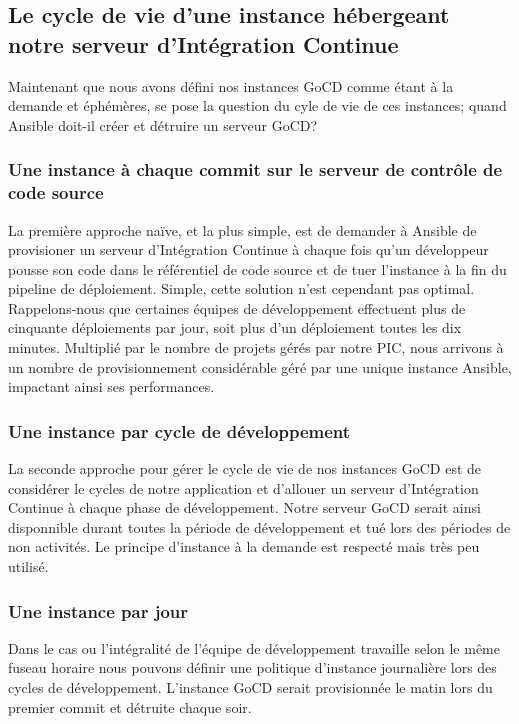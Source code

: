         \subsection{Le cycle de vie d'une instance hébergeant notre serveur d'Intégration Continue}
        Maintenant que nous avons défini nos instances GoCD comme étant à la demande et éphémères, se pose la question du cyle de vie de ces instances; quand Ansible doit-il créer et détruire un serveur GoCD?\\

          \subsubsection{Une instance à chaque commit sur le serveur de contrôle de code source}
          La première approche naïve, et la plus simple, est de demander à Ansible de provisioner un serveur d'Intégration Continue à chaque fois qu'un développeur pousse son code dans le référentiel de code source et de tuer l'instance à la fin du pipeline de déploiement. Simple, cette solution n'est cependant pas optimal. Rappelons-nous que certaines équipes de développement effectuent plus de cinquante déploiements par jour, soit plus d'un déploiement toutes les dix minutes. Multiplié par le nombre de projets gérés par notre PIC, nous arrivons à un nombre de provisionnement considérable géré par une unique instance Ansible, impactant ainsi ses performances.

          \subsubsection{Une instance par cycle de développement}
          La seconde approche pour gérer le cycle de vie de nos instances GoCD est de considérer le cycles de notre application et d'allouer un serveur d'Intégration Continue à chaque phase de développement. Notre serveur GoCD serait ainsi disponnible durant toutes la période de développement et tué lors des périodes de non activités. Le principe d'instance à la demande est respecté mais très peu utilisé.

          \subsubsection{Une instance par jour}
          Dans le cas ou l'intégralité de l'équipe de développement travaille selon le même fuseau horaire nous pouvons définir une politique d'instance journalière lors des cycles de développement. L'instance GoCD serait provisionnée le matin lors du premier commit et détruite chaque soir.

